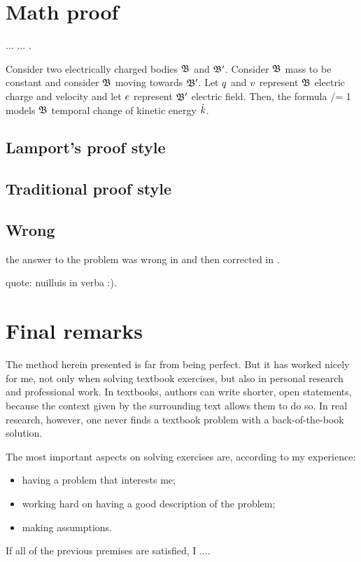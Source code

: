 \section{Math proof}
%
... \cite[chap. 1]{lehman:2011} ... \cite{houston:2009}.
 
Consider two electrically charged bodies $\mathfrak{B}$ and $\mathfrak{B}'$. Consider $\mathfrak{B}$ mass to be constant and consider $\mathfrak{B}$ moving towards $\mathfrak{B}'$. Let $q$ and $v$ represent $\mathfrak{B}$ electric charge and velocity and let $e$ represent $\mathfrak{B}'$ electric field. Then, the formula
%
\beq
  \dt\ekin/\echarge\efield\iprod\vel = 1
\eeq
%
models $\mathfrak{B}$ temporal change of kinetic energy $\dot{k}$.


\subsection{Lamport's proof style}
%


\subsection{Traditional proof style}
%



\subsection{Wrong}
%
the answer to the problem was wrong in \cite{thorne:2011} and then corrected in \cite{thorne:2013}.

quote: nuilluis in verba :).


\section{Final remarks}
%
The method herein presented is far from being perfect. But it has worked nicely for me, not only when solving textbook exercises, but also in personal research and professional work. In textbooks, authors can write shorter, open statements, because the context given by the surrounding text allows them to do so. In real research, however, one never finds a textbook problem with a back-of-the-book solution.

The most important aspects on solving exercises are, according to my experience:
%
\begin{itemize}
%
\item having a problem that interests me;
%
\item working hard on having a good description of the problem;
%
\item making assumptions.
%
\end{itemize}
%
If all of the previous premises are satisfied, I ....

